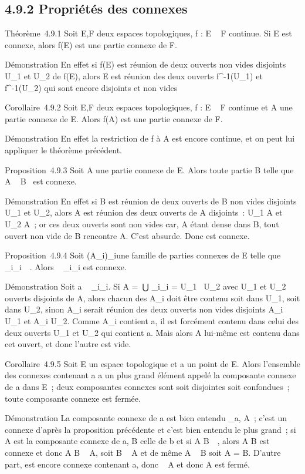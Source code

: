\documentclass[]{article}
\begin{document}
\subsection{4.9.2 Propriétés des connexes}

Théorème~4.9.1 Soit E,F deux espaces topologiques, f : E \rightarrow~ F continue.
Si E est connexe, alors f(E) est une partie connexe de F.

Démonstration En effet si f(E) est réunion de deux ouverts non vides
disjoints U_1 et U_2 de f(E), alors E est réunion des
deux ouverts f^-1(U_1) et
f^-1(U_2) qui sont encore disjoints et non vides

Corollaire~4.9.2 Soit E,F deux espaces topologiques, f : E \rightarrow~ F continue
et A une partie connexe de E. Alors f(A) est une partie connexe de F.

Démonstration En effet la restriction de f à A est encore continue, et
on peut lui appliquer le théorème précédent.

Proposition~4.9.3 Soit A une partie connexe de E. Alors toute partie B
telle que A \subset~ B \subset~\overlineA est connexe.

Démonstration En effet si B est réunion de deux ouverts de B non vides
disjoints U_1 et U_2, alors A est réunion des deux
ouverts de A disjoints~: U_1 \bigcap A et U_2 \bigcap A~; or ces
deux ouverts sont non vides car, A étant dense dans B, tout ouvert non
vide de B rencontre A. C'est absurde. Donc \overlineA
est connexe.

Proposition~4.9.4 Soit (A_i)_i\inI une famille de
parties connexes de E telle que
\⋂ ~
_i\inIA_i\neq~\varnothing~. Alors
\⋃ ~
_i\inIA_i est connexe.

Démonstration Soit a
\in\⋂ ~
_i\inIA_i. Si A =\
⋃  _i\inIA_i = U_1~ \cup
U_2 avec U_1 et U_2 ouverts disjoints de A,
alors chacun des A_i doit être contenu soit dans U_1,
soit dans U_2, sinon A_i serait réunion des deux
ouverts non vides disjoints A_i \bigcap U_1 et A_i
\bigcap U_2. Comme A_i contient a, il est forcément contenu
dans celui des deux ouverts U_1 et U_2 qui contient a.
Mais alors A lui-même est contenu dans cet ouvert, et donc l'autre est
vide.

Corollaire~4.9.5 Soit E un espace topologique et a un point de E. Alors
l'ensemble des connexes contenant a a un plus grand élément appelé la
composante connexe de a dans E~; deux composantes connexes sont soit
disjointes soit confondues~; toute composante connexe est fermée.

Démonstration La composante connexe de a est bien entendu
\⋃  _a\inA,
A\textconnexeA~; c'est un connexe d'après la
proposition précédente et c'est bien entendu le plus grand~; si A est la
composante connexe de a, B celle de b et si A \bigcap
B\neq~\varnothing~, alors A \cup B est connexe et donc A \cup B \subset~
A, soit B \subset~ A et de même A \subset~ B soit A = B. D'autre part,
\overlineA est encore connexe contenant a, donc
\overlineA \subset~ A et donc A est fermé.
\end{document}
